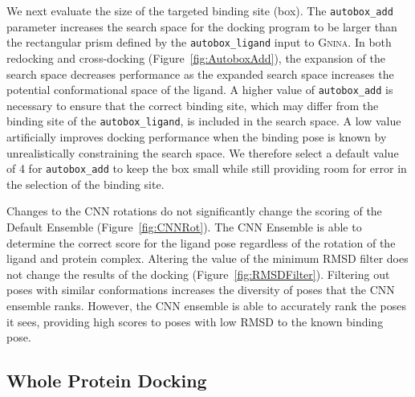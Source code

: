 \documentclass[journal=jcisd8,manuscript=article]{achemso}
\begin{document}
We next evaluate the size of the targeted binding site (box). The \texttt{autobox\_add} parameter increases the search space for the docking program to be larger than the rectangular prism defined by the \texttt{autobox\_ligand} input to \textsc{Gnina}. In both redocking and cross-docking (Figure~\ref{fig:AutoboxAdd}), the expansion of the search space decreases performance as the expanded search space increases the potential conformational space of the ligand. A higher value of \texttt{autobox\_add} is necessary to ensure that the correct binding site, which may differ from the binding site of the \texttt{autobox\_ligand}, is included in the search space. A low value artificially improves docking performance when the binding pose is known by unrealistically constraining the search space. We therefore select a default value of 4 for \texttt{autobox\_add} to keep the box small while still providing room for error in the selection of the binding site.

Changes to the CNN rotations do not significantly change the scoring of the Default Ensemble (Figure~\ref{fig:CNNRot}). The CNN Ensemble is able to determine the correct score for the ligand pose regardless of the rotation of the ligand and protein complex. Altering the value of the minimum RMSD filter does not change the results of the docking (Figure~\ref{fig:RMSDFilter}).  Filtering out poses with similar conformations increases the diversity of poses that the CNN ensemble ranks. However, the CNN ensemble is able to accurately rank the poses it sees, providing high scores to poses with low RMSD to the known binding pose.

\subsection{Whole Protein Docking}
\end{document}
